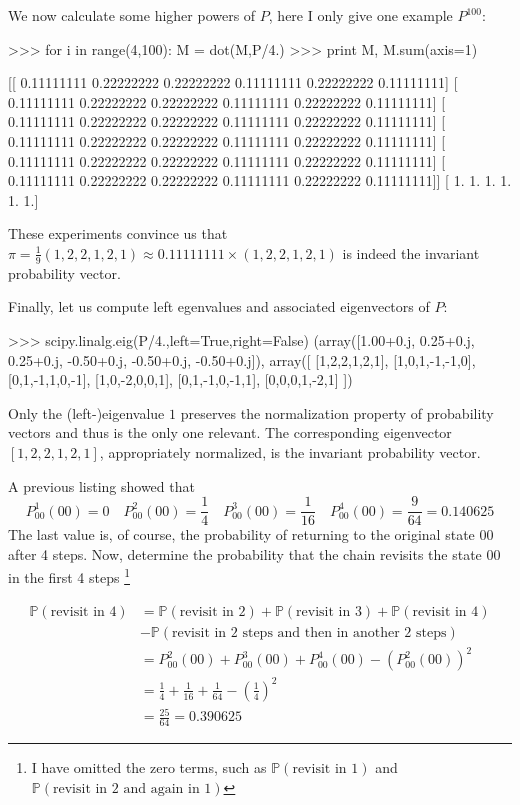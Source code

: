 \documentclass[8pt,notitlepage]{report}
\newenvironment{solution}[1][Solution]{\begin{trivlist}
    \item[\hskip \labelsep {\bfseries #1}]}{\end{trivlist}}
\newcommand{\PP}{\mathbb{P}}
\begin{document}
\begin{solution}
We now calculate some higher powers of $P$, here I only give one example $P^{100}$:

\small
\begin{verbatimtab}[4]
>>> for i in range(4,100):
		M = dot(M,P/4.)
>>> print M, M.sum(axis=1)

[[ 0.11111111  0.22222222  0.22222222  0.11111111  0.22222222  0.11111111]
 [ 0.11111111  0.22222222  0.22222222  0.11111111  0.22222222  0.11111111]
 [ 0.11111111  0.22222222  0.22222222  0.11111111  0.22222222  0.11111111]
 [ 0.11111111  0.22222222  0.22222222  0.11111111  0.22222222  0.11111111]
 [ 0.11111111  0.22222222  0.22222222  0.11111111  0.22222222  0.11111111]
 [ 0.11111111  0.22222222  0.22222222  0.11111111  0.22222222  0.11111111]]
[ 1.  1.  1.  1.  1.  1.]
\end{verbatimtab}
\normalsize

These experiments convince us that $\pi = \frac{1}{9} ( 1,2,2,1,2,1 ) \approx 0.11111111 \times (1,2,2,1,2,1) $
is indeed the invariant probability vector. 

Finally, let us compute left egenvalues and associated eigenvectors of $P$:
\begin{verbatimtab}[4]
>>> scipy.linalg.eig(P/4.,left=True,right=False)
(array([1.00+0.j,  0.25+0.j, 0.25+0.j, -0.50+0.j, -0.50+0.j, -0.50+0.j]),
array([
	[1,2,2,1,2,1],
	[1,0,1,-1,-1,0],
	[0,1,-1,1,0,-1],
	[1,0,-2,0,0,1],
	[0,1,-1,0,-1,1],
	[0,0,0,1,-2,1] ])
\end{verbatimtab}
Only the (left-)eigenvalue $1$ preserves the normalization property of
probability vectors and thus is the only one relevant. The corresponding eigenvector $[1,2,2,1,2,1]$, 
appropriately normalized, is the invariant probability vector.

A previous listing showed that
$$
	P^1_{00} (00) = 0 \quad
  	P^2_{00} (00) = \frac{1}{4} \quad
	P^3_{00} (00) = \frac{1}{16} \quad
	P^4_{00} (00) = \frac{9}{64} = 0.140625
$$
The last value is, of course, the probability of returning to the original state $00$ after 4 steps.
Now, determine the probability %
that the chain revisits the state $00$ in the first 4 steps
\footnote{I have omitted the zero terms, such as $\PP(\textrm{revisit in 1})$ and $\PP(\textrm{revisit in 2 and again in 1})$}

\begin{equation}
\begin{split}
	\PP(\textrm{revisit in 4}) &= \PP (\textrm{revisit in 2}) 
			+ \PP(\textrm{revisit in 3}) 
			+ \PP(\textrm{revisit in 4}) \\
			& - \PP(\textrm{revisit in 2 steps and then in another 2 steps}) \\
		 &= P^2_{00}(00) + P^3_{00}(00) + P^4_{00}(00) - (P^2_{00}(00))^2 \\
		 &= \frac{1}{4} + \frac{1}{16} + \frac{1}{64} - (\frac{1}{4})^2 \\
		 &= \frac{25}{64} = 0.390625
\end{split}
\end{equation}
\marginpar{\tiny $\PP(A\cup B)=\PP(A)+\PP(B)-\PP(A\cap B)$ \normalsize}


\end{solution}
\end{document}
